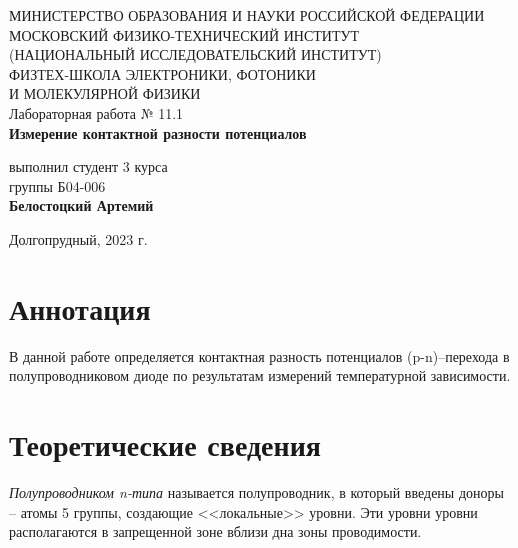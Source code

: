 \documentclass[a4paper,12pt]{article}
\begin{document}
 

\begin{titlepage}
	\begin{center}
		\large 	МИНИСТЕРСТВО ОБРАЗОВАНИЯ И НАУКИ РОССИЙСКОЙ ФЕДЕРАЦИИ\\
				МОСКОВСКИЙ ФИЗИКО-ТЕХНИЧЕСКИЙ ИНСТИТУТ \\
				(НАЦИОНАЛЬНЫЙ ИССЛЕДОВАТЕЛЬСКИЙ ИНСТИТУТ)\\ 
				ФИЗТЕХ-ШКОЛА ЭЛЕКТРОНИКИ, ФОТОНИКИ \\
				И МОЛЕКУЛЯРНОЙ ФИЗИКИ \\
		
		
		\vspace{4.0 cm}
		Лабораторная работа № 11.1 \\
		\LARGE \textbf{Измерение контактной разности потенциалов	}
	\end{center}
	\vspace{3 cm} \large
	
	\begin{flushright}
		выполнил студент 3 курса \\
		{группы Б04-006}\\
		\textbf{Белостоцкий Артемий}\\
	\end{flushright}
	
	\vfill

	\begin{center}
	Долгопрудный, 2023 г.
	\end{center}
\end{titlepage}                                                                      

\section*{Аннотация}

В данной работе определяется контактная разность потенциалов (p-n)--перехода в полупроводниковом диоде по результатам измерений температурной зависимости.

\section*{Теоретические сведения}

\textit{Полупроводником n-типа} называется полупроводник, в который введены доноры -- атомы 5 группы, создающие <<локальные>> уровни. Эти уровни уровни располагаются в запрещенной зоне вблизи дна зоны проводимости.
\end{document}
